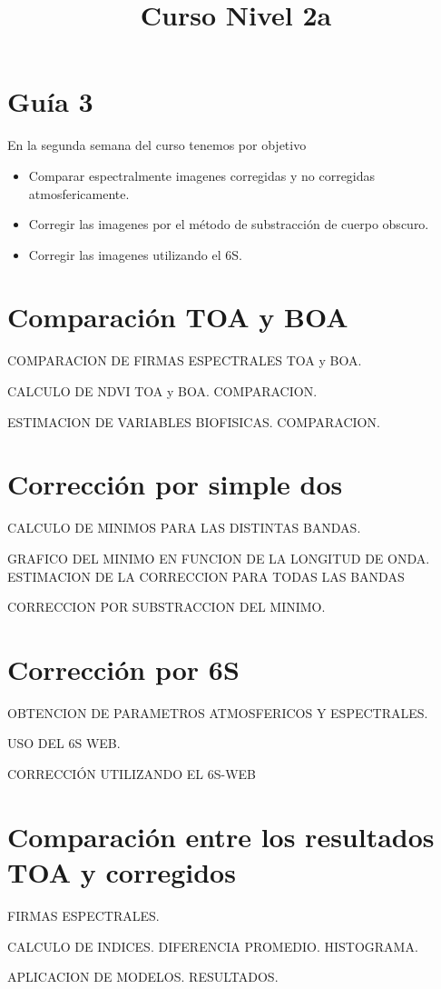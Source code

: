 \documentclass[a4paper]{article}
\title{Curso Nivel 2a}
\begin{document}
\section{Guía 3}
En la segunda semana del curso tenemos por objetivo
\begin{itemize}
    \item Comparar espectralmente imagenes corregidas y no corregidas atmosfericamente.
    \item Corregir las imagenes por el método de substracción de cuerpo obscuro.
    \item Corregir las imagenes utilizando el 6S.
\end{itemize}

\section{Comparación TOA y BOA}

COMPARACION DE FIRMAS ESPECTRALES TOA y BOA.

CALCULO DE NDVI TOA y BOA. COMPARACION.

ESTIMACION DE VARIABLES BIOFISICAS. COMPARACION.

\section{Corrección por simple dos}

CALCULO DE MINIMOS PARA LAS DISTINTAS BANDAS.

GRAFICO DEL MINIMO EN FUNCION DE LA LONGITUD DE ONDA. ESTIMACION DE LA CORRECCION PARA TODAS LAS BANDAS

CORRECCION POR SUBSTRACCION DEL MINIMO.
\section{Corrección por 6S}

OBTENCION DE PARAMETROS ATMOSFERICOS Y ESPECTRALES.

USO DEL 6S WEB.

CORRECCIÓN UTILIZANDO EL 6S-WEB

\section{Comparación entre los resultados TOA y corregidos}

FIRMAS ESPECTRALES.

CALCULO DE INDICES. DIFERENCIA PROMEDIO. HISTOGRAMA.

APLICACION DE MODELOS. RESULTADOS.
\end{document}
